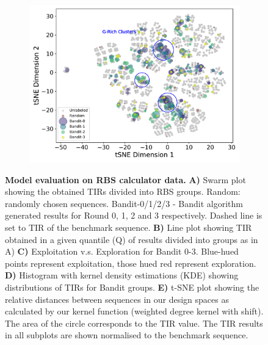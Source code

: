 \documentclass{scrartcl}[2013/05/29]%
\begin{document}
\begin{figure}[!ht]
\begin{subfigure}[b]{0.48\textwidth}
    \end{subfigure}
    \begin{subfigure}[b]{0.48\textwidth}
        \centering
        \caption{}
        \includegraphics[scale=0.42]{plots/Supplementary/tsneplot_salis.pdf}
    \end{subfigure}
    \caption{
    \textbf{Model evaluation on RBS calculator data.}
    \textbf{A)} Swarm plot showing the obtained TIRs divided into RBS groups.
    Random: randomly chosen sequences.
    Bandit-0/1/2/3 - Bandit algorithm generated results for Round 0, 1, 2 and 3 respectively.
    Dashed line is set to TIR of the benchmark sequence.
    \textbf{B)} Line plot showing TIR obtained in a given quantile (Q) of results divided into groups as in A)
    \textbf{C)} Exploitation v.s. Exploration for Bandit 0-3. Blue-hued points represent exploitation, those hued red represent exploration.
    \textbf{D)} Histogram with kernel density estimations (KDE) showing distributions of TIRs for Bandit groups.
    \textbf{E)} t-SNE plot showing the relative distances between sequences in our design spaces as calculated by our kernel function (weighted degree kernel with shift).
    The area of the circle corresponds to the TIR value.
    The TIR results in all subplots are shown normalised to the  benchmark sequence.}
    \label{fig: Swarmplot and Quantplot Salis}
\end{figure}
\end{document}
